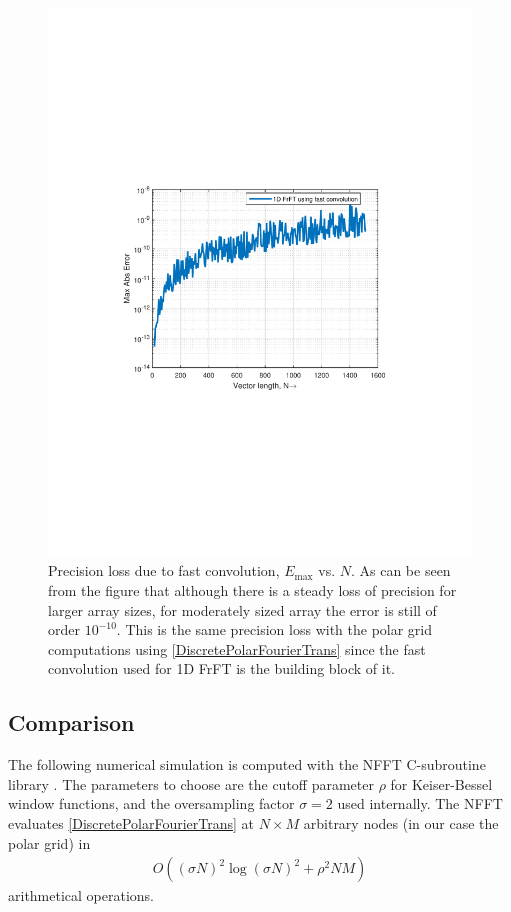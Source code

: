 \documentclass{UCF_ETD}
\begin{document}
{ 
 \begin{figure}[H]
 \begin{center}
 \includegraphics[scale=0.8]{PolarSphericalDFT/PrecisionLoss}
 \caption{Precision loss due to fast convolution, $E_{\max}$ vs. $N$. As can be seen from the figure that although there is a steady loss of precision for larger array sizes, for moderately sized array the error is still of order $10^{-10}$. This is the same precision loss with the polar grid computations using \eqref{DiscretePolarFourierTrans} since the fast convolution used for 1D FrFT is the building block of it. }
 \label{PrecisionLoss.fig}
 \end{center}
 \end{figure}
 
 \subsection{Comparison}
 
 The following numerical simulation is computed with the NFFT C-subroutine library \cite{Potts2002}. The parameters to choose are the cutoff parameter $\rho$ for Keiser-Bessel window functions, and the oversampling factor $\sigma=2$ used internally. The NFFT evaluates \eqref{DiscretePolarFourierTrans} at $N\times M$ arbitrary nodes (in our case the polar grid) in
 \begin{eqnarray}
 O( (\sigma N)^2 \log(\sigma N)^2 + \rho^2 N M )
 \end{eqnarray}
 arithmetical operations.
 
}
\end{document}
